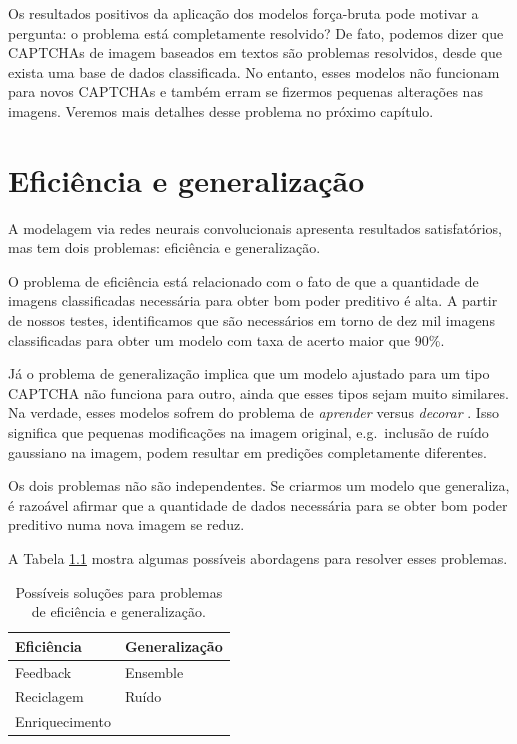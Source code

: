 \documentclass[12pt,]{report}
\begin{document}
Os resultados positivos da aplicação dos modelos força-bruta pode
motivar a pergunta: o problema está completamente resolvido? De fato,
podemos dizer que CAPTCHAs de imagem baseados em textos são problemas
resolvidos, desde que exista uma base de dados classificada. No entanto,
esses modelos não funcionam para novos CAPTCHAs e também erram se
fizermos pequenas alterações nas imagens. Veremos mais detalhes desse
problema no próximo capítulo.

\chapter{Eficiência e generalização}\label{eficiencia-e-generalizacao}

A modelagem via redes neurais convolucionais apresenta resultados
satisfatórios, mas tem dois problemas: eficiência e generalização.

O problema de eficiência está relacionado com o fato de que a quantidade
de imagens classificadas necessária para obter bom poder preditivo é
alta. A partir de nossos testes, identificamos que são necessários em
torno de dez mil imagens classificadas para obter um modelo com taxa de
acerto maior que 90\%.

Já o problema de generalização implica que um modelo ajustado para um
tipo CAPTCHA não funciona para outro, ainda que esses tipos sejam muito
similares. Na verdade, esses modelos sofrem do problema de
\emph{aprender} versus \emph{decorar} \citep{zhang2016understanding}.
Isso significa que pequenas modificações na imagem original,
e.g.~inclusão de ruído gaussiano na imagem, podem resultar em predições
completamente diferentes.

Os dois problemas não são independentes. Se criarmos um modelo que
generaliza, é razoável afirmar que a quantidade de dados necessária para
se obter bom poder preditivo numa nova imagem se reduz.

A Tabela \ref{tab:solucoes} mostra algumas possíveis abordagens para
resolver esses problemas.

\begin{table}

\caption{\label{tab:solucoes}Possíveis soluções para problemas de eficiência e generalização.}
\centering
\begin{tabular}[t]{l|l}
\hline
Eficiência & Generalização\\
\hline
Feedback & Ensemble\\
\hline
Reciclagem & Ruído\\
\hline
Enriquecimento & \\
\hline
\end{tabular}
\end{table}
\end{document}
